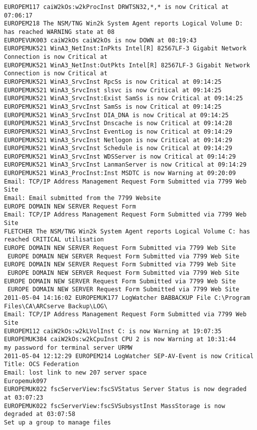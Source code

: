 \begin{lstlisting}
EUROPEM117 caiW2kOs:w2kProcInst DRWTSN32,*,* is now Critical at 07:06:17
EUROPEM218 The NSM/TNG Win2k System Agent reports Logical Volume D: has reached WARNING state at 08
EUROPEVUK003 caiW2kOs caiW2kOs is now DOWN at 08:19:43
EUROPEMUK521 WinA3_NetInst:InPkts Intel[R] 82567LF-3 Gigabit Network Connection is now Critical at
EUROPEMUK521 WinA3_NetInst:OutPkts Intel[R] 82567LF-3 Gigabit Network Connection is now Critical at
EUROPEMUK521 WinA3_SrvcInst RpcSs is now Critical at 09:14:25
EUROPEMUK521 WinA3_SrvcInst slsvc is now Critical at 09:14:25
EUROPEMUK521 WinA3_SrvcInst:Exist SamSs is now Critical at 09:14:25
EUROPEMUK521 WinA3_SrvcInst SamSs is now Critical at 09:14:25
EUROPEMUK521 WinA3_SrvcInst DIA_DNA is now Critical at 09:14:25
EUROPEMUK521 WinA3_SrvcInst Dnscache is now Critical at 09:14:28
EUROPEMUK521 WinA3_SrvcInst EventLog is now Critical at 09:14:29
EUROPEMUK521 WinA3_SrvcInst Netlogon is now Critical at 09:14:29
EUROPEMUK521 WinA3_SrvcInst Schedule is now Critical at 09:14:29
EUROPEMUK521 WinA3_SrvcInst WDSServer is now Critical at 09:14:29
EUROPEMUK521 WinA3_SrvcInst LanmanServer is now Critical at 09:14:29
EUROPEMUK521 WinA3_ProcInst:Inst MSDTC is now Warning at 09:20:09
Email: TCP/IP Address Management Request Form Submitted via 7799 Web Site
Email: Email submitted from the 7799 Website
EUROPE DOMAIN NEW SERVER Request Form
Email: TCP/IP Address Management Request Form Submitted via 7799 Web Site
FLETCHER The NSM/TNG Win2k System Agent reports Logical Volume C: has reached CRITICAL utilisation
EUROPE DOMAIN NEW SERVER Request Form Submitted via 7799 Web Site
 EUROPE DOMAIN NEW SERVER Request Form Submitted via 7799 Web Site
EUROPE DOMAIN NEW SERVER Request Form Submitted via 7799 Web Site
 EUROPE DOMAIN NEW SERVER Request Form Submitted via 7799 Web Site
EUROPE DOMAIN NEW SERVER Request Form Submitted via 7799 Web Site
 EUROPE DOMAIN NEW SERVER Request Form Submitted via 7799 Web Site
2011-05-04 14:16:02 EUROPEMUK177 LogWatcher BABBACKUP File C:\Program Files\CA\ARCserve Backup\LOG\
Email: TCP/IP Address Management Request Form Submitted via 7799 Web Site
EUROPEM112 caiW2kOs:w2kLVolInst C: is now Warning at 19:07:35
EUROPEMUK384 caiW2kOs:w2kCpuInst CPU 2 is now Warning at 10:31:44
my password for terminal server URMW
2011-05-04 12:12:29 EUROPEM214 LogWatcher SEP-AV-Event is now Critical
Title: OCS Federation
Email: lost link to new 207 server space
Europemuk097
EUROPEMUK022 fscServerView:fscSVStatus Server Status is now degraded at 03:07:23
EUROPEMUK022 fscServerView:fscSVSubsystInst MassStorage is now degraded at 03:07:58
Set up a group to manage files

\end{lstlisting}

